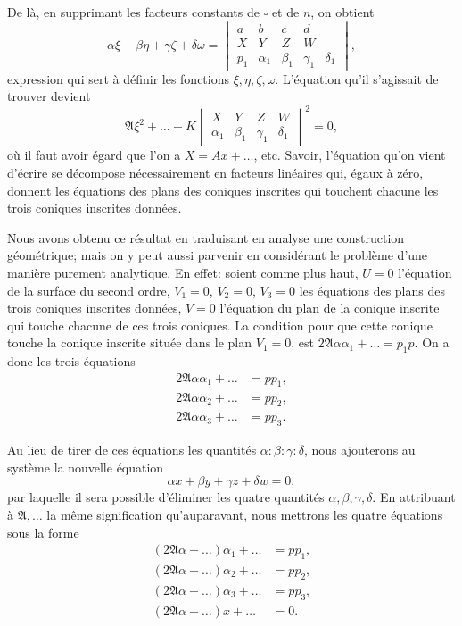\documentclass[12pt,a4paper]{article}
\theoremstyle{definition}
\begin{document}
De l\`{a}, en supprimant les facteurs constants de $\square$ et de $n$, on obtient
\[
\alpha \xi + \beta \eta + \gamma \zeta + \delta \omega =
\begin{vmatrix}
a & b & c & d \\
X & Y & Z & W \\
p_1 & \alpha_1 & \beta_1 & \gamma_1 & \delta_1
\end{vmatrix},
\]
expression qui sert \`{a} d\'{e}finir les fonctions $\xi, \eta, \zeta, \omega$. L'\'{e}quation qu'il s'agissait de trouver devient
\[
\mathfrak{A}\xi^2 + \ldots - K
\begin{vmatrix}
X & Y & Z & W \\
\alpha_1 & \beta_1 & \gamma_1 & \delta_1
\end{vmatrix}^2 = 0,
\]
o\`{u} il faut avoir \'{e}gard que l'on a $X = Ax + \ldots$, etc. Savoir, l'\'{e}quation qu'on vient d'\'{e}crire se d\'{e}compose n\'{e}cessairement en facteurs lin\'{e}aires qui, \'{e}gaux \`{a} z\'{e}ro, donnent les \'{e}quations des plans des coniques inscrites qui touchent chacune les trois coniques inscrites donn\'{e}es.

Nous avons obtenu ce r\'{e}sultat en traduisant en analyse une construction g\'{e}om\'{e}trique; mais on y peut aussi parvenir en consid\'{e}rant le probl\`{e}me d'une mani\`{e}re purement analytique. En effet: soient comme plus haut, $U = 0$ l'\'{e}quation de la surface du second ordre, $V_1 = 0$, $V_2 = 0$, $V_3 = 0$ les \'{e}quations des plans des trois coniques inscrites donn\'{e}es, $V = 0$ l'\'{e}quation du plan de la conique inscrite qui touche chacune de ces trois coniques. La condition pour que cette conique touche la conique inscrite situ\'{e}e dans le plan $V_1 = 0$, est $2\mathfrak{A}\alpha\alpha_1 + \ldots = p_1 p$. On a donc les trois \'{e}quations
\begin{align*}
2\mathfrak{A}\alpha\alpha_1 + \ldots &= pp_1, \\
2\mathfrak{A}\alpha\alpha_2 + \ldots &= pp_2, \\
2\mathfrak{A}\alpha\alpha_3 + \ldots &= pp_3.
\end{align*}

Au lieu de tirer de ces \'{e}quations les quantit\'{e}s $\alpha : \beta : \gamma : \delta$, nous ajouterons au syst\`{e}me la nouvelle \'{e}quation
\[
\alpha x + \beta y + \gamma z + \delta w = 0,
\]
par laquelle il sera possible d'\'{e}liminer les quatre quantit\'{e}s $\alpha, \beta, \gamma, \delta$. En attribuant \`{a} $\mathfrak{A}, \ldots$ la m\^{e}me signification qu'auparavant, nous mettrons les quatre \'{e}quations sous la forme
\begin{align*}
(2\mathfrak{A}\alpha + \ldots)\alpha_1 + \ldots &= pp_1, \\
(2\mathfrak{A}\alpha + \ldots)\alpha_2 + \ldots &= pp_2, \\
(2\mathfrak{A}\alpha + \ldots)\alpha_3 + \ldots &= pp_3, \\
(2\mathfrak{A}\alpha + \ldots)x + \ldots &= 0.
\end{align*}
\end{document}
